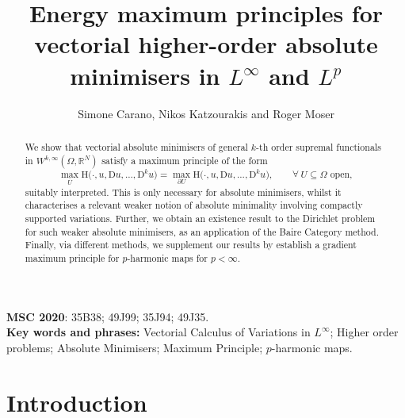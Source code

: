 \documentclass[a4paper,11pt]{article}
\title{Energy maximum principles for vectorial higher-order absolute minimisers in $L^\infty$ and $L^p$
}
\author{
Simone Carano, Nikos Katzourakis and Roger Moser}
\numberwithin{equation}{section}
\newcommand{\Om}{\Omega}
\newcommand{\rom}{\mathrm}
\theoremstyle{definition}
\begin{document}
\maketitle

\begin{abstract} 
We show that vectorial absolute minimisers of general $k$-th order supremal functionals in $W^{k,\infty}(\Omega,\mathbb R^N)$ satisfy a maximum principle of the form
$$
\max_{\overline U} \rom{H} \big(\cdot, u,  \mathrm D u, ..., \mathrm D^{k}u\big)=\max_{\partial U}\rom{H} \big(\cdot, u,  \mathrm D u, ..., \mathrm D^{k}u\big), \qquad\forall\ U\subseteq\Om \mbox{ open},
$$
suitably interpreted. This is only necessary for absolute minimisers, whilst it characterises a relevant weaker notion of absolute minimality involving compactly supported variations. Further, we obtain an existence result to the Dirichlet problem for such weaker absolute minimisers, as an application of the Baire Category method. Finally, via different methods, we supplement our results by establish a gradient maximum principle for $p$-harmonic maps for $p<\infty$.
\end{abstract}
{\bf MSC 2020}: 35B38; 49J99; 35J94; 49J35.\\
{\bf Key words and phrases:} Vectorial Calculus of Variations in $L^\infty$; Higher order problems; Absolute Minimisers; Maximum Principle; $p$-harmonic maps.


\section{Introduction}\label{sec:introduction}
\end{document}
